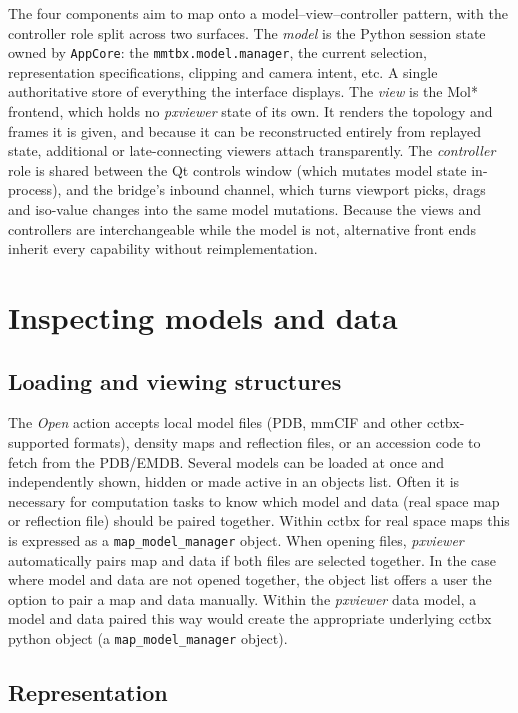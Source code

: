 \documentclass[11pt]{article}
\newcommand{\pxviewer}{\emph{pxviewer}}
\begin{document}
The four components aim to map onto a model--view--controller pattern, with the
controller role split across two surfaces. The \emph{model} is the Python
session state owned by \texttt{AppCore}: the \texttt{mmtbx.model.manager}, the
current selection,
representation specifications, clipping and camera intent, etc. A single
authoritative store of everything the interface displays. The \emph{view} is
the Mol* frontend, which holds no  \pxviewer{} state of its own. It
renders the topology and frames it is given, and because it can be
reconstructed entirely from replayed state, additional or late-connecting
viewers attach transparently. The \emph{controller} role is shared between
the Qt controls window (which mutates model state in-process), and the
bridge's inbound channel, which turns viewport picks, drags and iso-value
changes into the same model mutations. Because the views and controllers are
interchangeable while the model is not, alternative front ends inherit every capability
without reimplementation.

\section{Inspecting models and data}

\subsection{Loading and viewing structures}

The \emph{Open} action accepts local model files (PDB, mmCIF and other
cctbx-supported formats), density maps and reflection files, or an accession
code to fetch from the PDB/EMDB. Several models can be loaded at once and
independently shown, hidden or made active in an objects list.
Often it is necessary for computation tasks to know which model and data (real space map or reflection file) 
should be paired together. Within cctbx for real space maps this is expressed as a \texttt{map\_model\_manager} object.
When opening files, \pxviewer{} automatically pairs map and data if both files are selected together. In the case
where model and data are not opened together, the object list offers a user the option to 
pair a map and data manually. Within the \pxviewer{} data model, a model and data paired this way would create the 
appropriate underlying cctbx python object (a \texttt{map\_model\_manager} object). 

\subsection{Representation}
\end{document}
